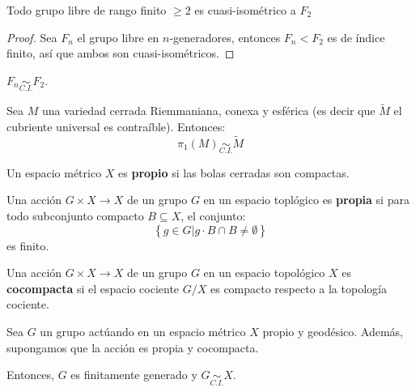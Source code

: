\documentclass[12pt]{report}
\newcounter{it}
\theoremstyle{largebreak}
\newcommand{\qisom}{\ensuremath{\underset{C.I.}{\sim}}}
\begin{document}
    \begin{propo}
        Todo grupo libre de rango finito $\geq2$ es cuasi-isométrico a $F_2$
    \end{propo}

    \begin{proof}
        Sea $F_n$ el grupo libre en $n$-generadores, entonces $F_n<F_2$ es de índice finito, así que ambos son cuasi-isométricos.
    \end{proof}

    \begin{cor}
        $F_n\qisom F_2$.
    \end{cor}

    \begin{theor}
        Sea $M$ una variedad cerrada Riemmaniana, conexa y esférica (es decir que $\widetilde{M}$ el cubriente universal es contraíble). Entonces:
        \begin{equation*}
            \pi_1(M)\qisom\widetilde{ M}
        \end{equation*}
    \end{theor}

    \begin{mydef}
        Un espacio métrico $X$ es \textbf{propio} si las bolas cerradas son compactas.
    \end{mydef}

    \begin{mydef}
        Una acción $G\times X\rightarrow X$ de un grupo $G$ en un espacio toplógico es \textbf{propia} si para todo subconjunto compacto $B\subseteq X$, el conjunto:
        \begin{equation*}
            \left\{g\in G\Big|g\cdot B\cap B\neq\emptyset \right\}
        \end{equation*}
        es finito.
    \end{mydef}

    \begin{mydef}
        Una acción $G\times X\rightarrow X$ de un grupo $G$ en un espacio topológico $X$ es \textbf{cocompacta} si el espacio cociente $G/X$ es compacto respecto a la topología cociente. 
    \end{mydef}

    \begin{lema}
        Sea $G$ un grupo actúando en un espacio métrico $X$ propio y geodésico. Además, supongamos que la acción es propia y cocompacta.

        Entonces, $G$ es finitamente generado y $G\qisom X$.
    \end{lema}
\end{document}
